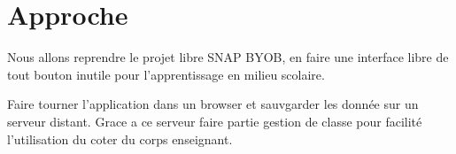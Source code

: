 \section{Approche}
Nous allons reprendre le projet libre SNAP BYOB, en faire une interface libre de tout bouton inutile pour l'apprentissage en milieu scolaire. 

Faire tourner l'application dans un browser et sauvgarder les donnée sur un serveur distant. Grace a ce serveur faire partie gestion de classe pour facilité l'utilisation du coter du corps enseignant.
